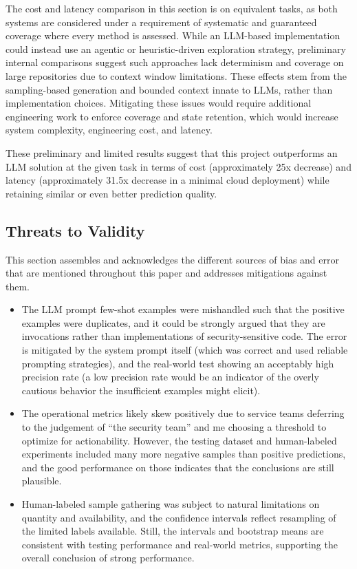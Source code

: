 \documentclass[11pt]{article}
\begin{document}
The cost and latency comparison in this section is on equivalent tasks,
as both systems are considered under a requirement of systematic and
guaranteed coverage where every method is assessed. While an LLM-based
implementation could instead use an agentic or heuristic-driven
exploration strategy, preliminary internal comparisons suggest such
approaches lack determinism and coverage on large repositories due to
context window limitations. These effects stem from the sampling-based
generation and bounded context innate to LLMs, rather than
implementation choices. Mitigating these issues would require additional
engineering work to enforce coverage and state retention, which would
increase system complexity, engineering cost, and latency.

These preliminary and limited results suggest that this project
outperforms an LLM solution at the given task in terms of cost
(approximately 25x decrease) and latency (approximately 31.5x decrease
in a minimal cloud deployment) while retaining similar or even better
prediction quality.

\subsection{Threats to Validity}\label{threats-to-validity}

This section assembles and acknowledges the different sources of bias
and error that are mentioned throughout this paper and addresses mitigations against them.

\begin{itemize}
\item
  The LLM prompt few-shot examples were mishandled such that the
  positive examples were duplicates, and it could be strongly argued
  that they are invocations rather than implementations of
  security-sensitive code. The error is mitigated by the system prompt itself (which was correct and used reliable prompting
  strategies), and the real-world test showing an acceptably high precision
  rate (a low precision rate would be an indicator of the overly
  cautious behavior the insufficient examples might elicit).
\item
  The operational metrics likely skew positively due to service teams
  deferring to the judgement of ``the security team'' and me choosing a
  threshold to optimize for actionability. However, the testing dataset and
  human-labeled experiments included many more negative samples than
  positive predictions, and the good performance on those indicates that
  the conclusions are still plausible.
\item
  Human-labeled sample gathering was subject to natural limitations on
  quantity and availability, and the confidence intervals reflect
  resampling of the limited labels available. Still, the intervals and
  bootstrap means are consistent with testing performance and
  real-world metrics, supporting the overall conclusion of strong
  performance.
\end{itemize}
\end{document}
